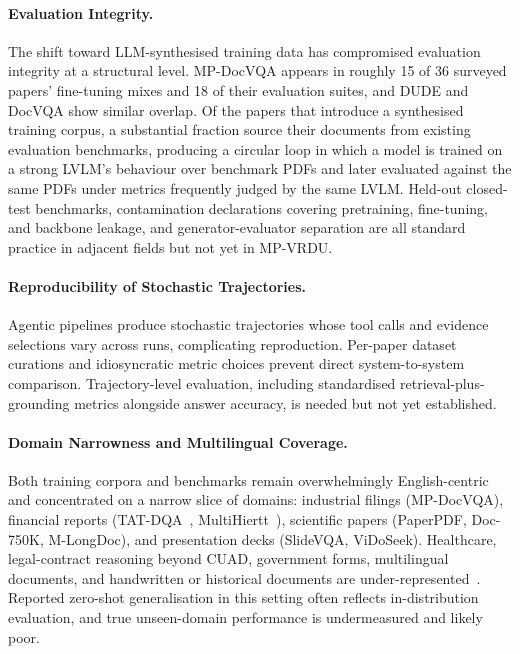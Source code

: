 \documentclass[11pt]{article}
\begin{document}
\paragraph{Evaluation Integrity.}
The shift toward LLM-synthesised training data has compromised evaluation integrity at a structural level. MP-DocVQA appears in roughly 15 of 36 surveyed papers' fine-tuning mixes and 18 of their evaluation suites, and DUDE and DocVQA show similar overlap. Of the papers that introduce a synthesised training corpus, a substantial fraction source their documents from existing evaluation benchmarks, producing a circular loop in which a model is trained on a strong LVLM's behaviour over benchmark PDFs and later evaluated against the same PDFs under metrics frequently judged by the same LVLM. Held-out closed-test benchmarks, contamination declarations covering pretraining, fine-tuning, and backbone leakage, and generator-evaluator separation are all standard practice in adjacent fields but not yet in MP-VRDU.

\paragraph{Reproducibility of Stochastic Trajectories.}
Agentic pipelines produce stochastic trajectories whose tool calls and evidence selections vary across runs, complicating reproduction. Per-paper dataset curations and idiosyncratic metric choices prevent direct system-to-system comparison. Trajectory-level evaluation, including standardised retrieval-plus-grounding metrics alongside answer accuracy, is needed but not yet established.

\paragraph{Domain Narrowness and Multilingual Coverage.}
Both training corpora and benchmarks remain overwhelmingly English-centric and concentrated on a narrow slice of domains: industrial filings (MP-DocVQA), financial reports (TAT-DQA~\cite{zhu2022tatdqa}, MultiHiertt~\cite{zhao2022multihiertt}), scientific papers (PaperPDF, Doc-750K, M-LongDoc), and presentation decks (SlideVQA, ViDoSeek). Healthcare, legal-contract reasoning beyond CUAD, government forms, multilingual documents, and handwritten or historical documents are under-represented~\cite{van2023document,ma2024mmlongbench,deng2025longdocurl}. Reported zero-shot generalisation in this setting often reflects in-distribution evaluation, and true unseen-domain performance is undermeasured and likely poor.
\end{document}
